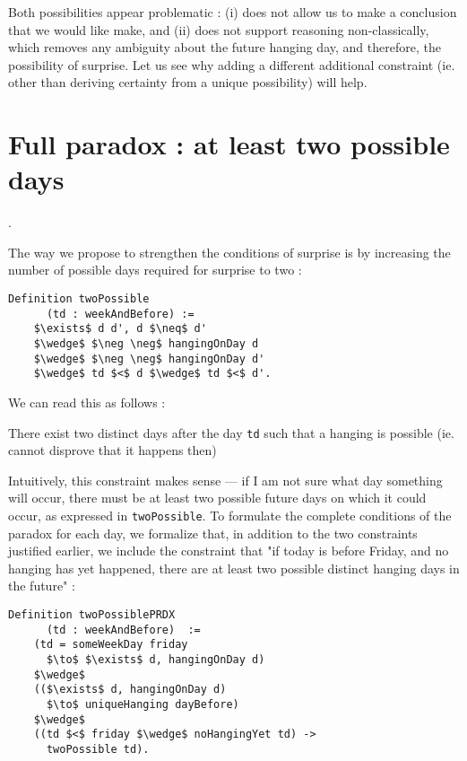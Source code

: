 \documentclass[journal]{journal}
\newenvironment{myindent}{\begin{adjustwidth}{1cm}{}}{\end{adjustwidth}}
\begin{document}
Both possibilities appear problematic : (i) does not allow us to make
a conclusion that we would like make,
and (ii) does not support reasoning non-classically, which removes any ambiguity
about the future hanging day, and therefore, the possibility of surprise.
Let us see why adding a different additional constraint (ie. other than deriving
certainty from a unique possibility) will help.

\section{Full paradox : at least two possible days}.
\label{sec:two}

The way we propose to strengthen the conditions of surprise is by increasing
the number of possible days required for surprise to two :

\begin{lstlisting}[mathescape=true]
  Definition twoPossible
      (td : weekAndBefore) :=
    $\exists$ d d', d $\neq$ d'
    $\wedge$ $\neg \neg$ hangingOnDay d
    $\wedge$ $\neg \neg$ hangingOnDay d'
    $\wedge$ td $<$ d $\wedge$ td $<$ d'.
\end{lstlisting}

We can read this as follows :

\begin{myindent}
  There exist two distinct days after the day {\tt td} such that
  a hanging is possible (ie. cannot disprove that it happens then)
\end{myindent}

Intuitively, this constraint makes sense --- if I am not sure what day something
will occur, there must be at least two possible future days on which it could occur,
as expressed in {\tt twoPossible}.
To formulate the complete conditions of the paradox for each day, we formalize that, in addition
to the two constraints justified earlier, we include the constraint that
"if today is before Friday, and no hanging has yet happened, there are at least
two possible distinct hanging days in the future" :

\begin{lstlisting}[mathescape=true]
  Definition twoPossiblePRDX
      (td : weekAndBefore)  :=
    (td = someWeekDay friday
      $\to$ $\exists$ d, hangingOnDay d)
    $\wedge$
    (($\exists$ d, hangingOnDay d)
      $\to$ uniqueHanging dayBefore)
    $\wedge$
    ((td $<$ friday $\wedge$ noHangingYet td) ->
      twoPossible td).
\end{lstlisting}
\end{document}
